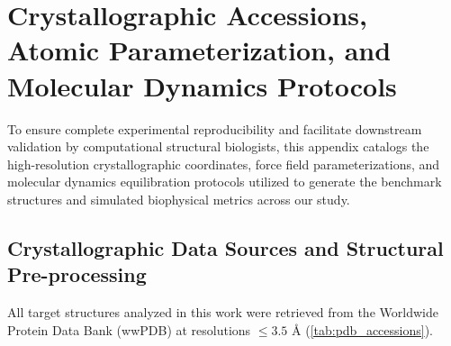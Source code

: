 \documentclass{article}
\theoremstyle{definition}
\begin{document}
\section{Crystallographic Accessions, Atomic Parameterization, and Molecular Dynamics Protocols}
\label{sec:crystallography_and_md}

To ensure complete experimental reproducibility and facilitate downstream validation by computational structural biologists, this appendix catalogs the high-resolution crystallographic coordinates, force field parameterizations, and molecular dynamics equilibration protocols utilized to generate the benchmark structures and simulated biophysical metrics across our study.

\subsection{Crystallographic Data Sources and Structural Pre-processing}
All target structures analyzed in this work were retrieved from the Worldwide Protein Data Bank (wwPDB) at resolutions $\le 3.5\text{ \AA}$ (\cref{tab:pdb_accessions}). 
\end{document}
